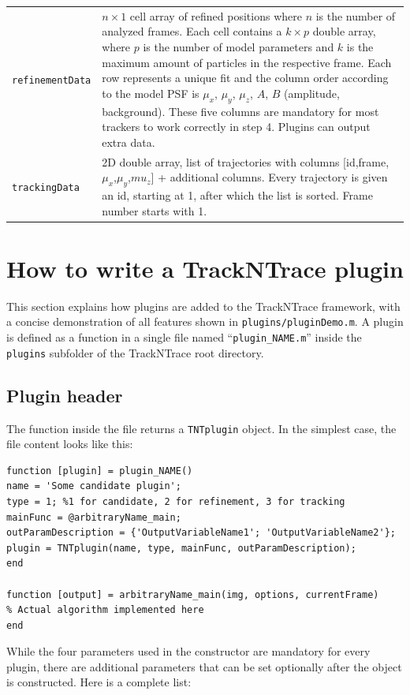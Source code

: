 \documentclass[11pt,onside]{report}
\numberwithin{equation}{chapter}
\begin{document}
\begin{table}[!h]
\begin{tabular}{p{} p{}}
\texttt{refinementData} & $n\times 1$ cell array of refined positions where $n$ is the number of analyzed frames. Each cell contains a $k\times p$ double array, where $p$ is the number of model parameters and $k$ is the maximum amount of particles in the respective frame. Each row represents a unique fit and the column order according to the model PSF is $\mu_x$, $\mu_y$, $\mu_z$, $A$, $B$ (amplitude, background). These five columns are mandatory for most trackers to work correctly in step 4. Plugins can output extra data.\\
\texttt{trackingData} & 2D double array, list of trajectories with columns  [id,frame,$\mu_x$,$\mu_y$,$mu_z$] + additional columns. Every trajectory is given an id, starting at 1, after which the list is sorted. Frame number starts with 1.\\
\bottomrule
\end{tabular}
\end{table}

\clearpage

\section{How to write a TrackNTrace plugin}\label{sec:howto_plugins}
This section explains how plugins are added to the TrackNTrace framework, with a concise demonstration of all features shown in \texttt{plugins/pluginDemo.m}. A plugin is defined as a function in a single file named ``\texttt{plugin\_NAME.m}'' inside the \texttt{plugins} subfolder of the TrackNTrace root directory. 

\subsection{Plugin header}
The function inside the file returns a \texttt{TNTplugin} object. In the simplest case, the file content looks like this:
\begin{lstlisting}[style=Matlab-editor]
function [plugin] = plugin_NAME()
name = 'Some candidate plugin';
type = 1; %1 for candidate, 2 for refinement, 3 for tracking
mainFunc = @arbitraryName_main;
outParamDescription = {'OutputVariableName1'; 'OutputVariableName2'};
plugin = TNTplugin(name, type, mainFunc, outParamDescription);
end

function [output] = arbitraryName_main(img, options, currentFrame) 
% Actual algorithm implemented here
end
\end{lstlisting}
While the four parameters used in the constructor are mandatory for every plugin, there are additional parameters that can be set optionally after the object is constructed. Here is a complete list:
\end{document}
